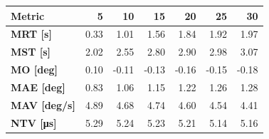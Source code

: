 \begin{tabular*}{\linewidth}{@{\extracolsep{\fill}}l|rrrrrr}
    \toprule
    \textbf{Metric} & \textbf{5} & \textbf{10} & \textbf{15} & \textbf{20} & \textbf{25} & \textbf{30} \\
    \midrule
    \textbf{MRT [s]} & 0.33 & 1.01 & 1.56 & 1.84 & 1.92 & 1.97 \\
    \textbf{MST [s]} & 2.02 & 2.55 & 2.80 & 2.90 & 2.98 & 3.07 \\
    \textbf{MO  [deg]} & 0.10 & -0.11 & -0.13 & -0.16 & -0.15 & -0.18 \\
    \textbf{MAE [deg]} & 0.83 & 1.06 & 1.15 & 1.22 & 1.26 & 1.28 \\
    \textbf{MAV [deg/s]} & 4.89 & 4.68 & 4.74 & 4.60 & 4.54 & 4.41 \\
    \textbf{NTV [\si{\micro\second}]} & 5.29 & 5.24 & 5.23 & 5.21 & 5.14 & 5.16 \\
    \bottomrule
\end{tabular*}

